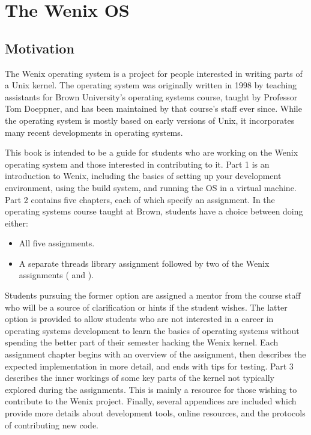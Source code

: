 \chapter{The Wenix OS}
\label{the-wenix-os}

\section{Motivation}


The Wenix operating system is a project for people interested in writing parts of a Unix kernel. The operating system was originally written in 1998 by teaching assistants for Brown University's operating systems course, taught by Professor Tom Doeppner, and has been maintained by that course's staff ever since. While the operating system is mostly based on early versions of Unix, it incorporates many recent developments in operating systems.
    
This book is intended to be a guide for students who are working on the Wenix operating system and those interested in contributing to it.
Part 1 is an introduction to Wenix, including the basics of setting up your development environment, using the build system, and running the OS in a virtual machine.
Part 2 contains five chapters, each of which specify an assignment. In the operating systems course taught at Brown, students have a choice between doing either:

\begin{itemize}
    \item All five assignments.
    \item A separate threads library assignment followed by two of the Wenix assignments ( and ).
\end{itemize}

Students pursuing the former option are assigned a mentor from the course staff who will be a source of clarification or hints if the student wishes. The latter option is provided to allow students who are not interested in a career in operating systems development to learn the basics of operating systems without spending the better part of their semester hacking the Wenix kernel. Each assignment chapter begins with an overview of the assignment, then describes the expected implementation in more detail, and ends with tips for testing.
Part 3 describes the inner workings of some key parts of the kernel not typically explored during the assignments. This is mainly a resource for those wishing to contribute to the Wenix project.
Finally, several appendices are included which provide more details about development tools, online resources, and the protocols of contributing new code.

